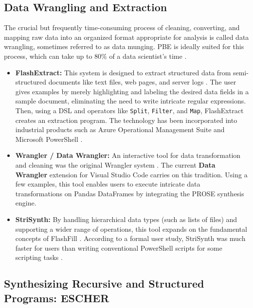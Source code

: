 \documentclass[12pt, a4paper]{report}
\begin{document}
\subsection{Data Wrangling and Extraction}

The crucial but frequently time-consuming process of cleaning, converting, and mapping raw data into an organized format appropriate for analysis is called data wrangling, sometimes referred to as data munging. PBE is ideally suited for this process, which can take up to 80\% of a data scientist's time \citep{kandel2011wrangler}.

\begin{itemize}
    \item \textbf{FlashExtract:} This system is designed to extract structured data from semi-structured documents like text files, web pages, and server logs \citep{le2014flashextract}. The user gives examples by merely highlighting and labeling the desired data fields in a sample document, eliminating the need to write intricate regular expressions. Then, using a DSL and operators like \texttt{Split}, \texttt{Filter}, and \texttt{Map}, FlashExtract creates an extraction program. The technology has been incorporated into industrial products such as Azure Operational Management Suite and Microsoft PowerShell \citep{polozov2015flashmeta}.
    \item \textbf{Wrangler / Data Wrangler:} An interactive tool for data transformation and cleaning was the original Wrangler system \citep{kandel2011wrangler}. The current \textbf{Data Wrangler} extension for Visual Studio Code carries on this tradition. Using a few examples, this tool enables users to execute intricate data transformations on Pandas DataFrames by integrating the PROSE synthesis engine.
    \item \textbf{StriSynth:} By handling hierarchical data types (such as lists of files) and supporting a wider range of operations, this tool expands on the fundamental concepts of FlashFill \citep{piskac2015automating}. According to a formal user study, StriSynth was much faster for users than writing conventional PowerShell scripts for some scripting tasks \citep{mayer2015user}.
\end{itemize}

\subsection{Synthesizing Recursive and Structured Programs: ESCHER}
\end{document}
